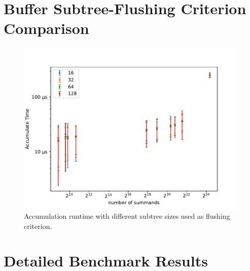 \section{Buffer Subtree-Flushing Criterion Comparison}

\begin{figure}[h!]
\centering
\includegraphics[scale=0.8]{figures/bufferSizes.pdf}
\caption{Accumulation runtime with different subtree sizes used as flushing criterion.}
\label{fig:bufferFlushingCriterion}
\end{figure}

\section{Detailed Benchmark Results}
\,
\newcommand{\mScale}{0.72}

